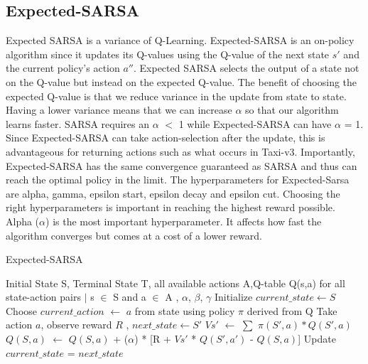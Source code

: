 \documentclass{svproc}
\begin{document}
\subsection{Expected-SARSA}
 Expected SARSA is a variance of Q-Learning. Expected-SARSA is an on-policy algorithm since it updates its Q-values using the Q-value of the next state $s'$ and the current policy's action $a''$. Expected SARSA selects the output of a state not on the Q-value but instead on the expected Q-value. The benefit of choosing the expected Q-value is that we reduce variance in the update from state to state. Having a lower variance means that we can increase $\alpha$ so that our algorithm learns faster. SARSA requires an \newline $\alpha$ $<$ 1 while Expected-SARSA can have $\alpha$ = 1. Since Expected-SARSA can take action-selection after the update, this is advantageous for returning actions such as what occurs in Taxi-v3. Importantly, Expected-SARSA has the same convergence guaranteed \citep{van2009theoretical} as SARSA and thus can reach the optimal policy in the limit.
\newline
The hyperparameters for Expected-Sarsa are alpha, gamma, epsilon start, epsilon decay and epsilon cut. Choosing the right hyperparameters is important in reaching the highest reward possible. Alpha ($\alpha$) is the most important hyperparameter. It affects how fast the algorithm converges but comes at a cost of a lower reward.

\begin{algorithm}[h]
\caption{Expected-SARSA}
\begin{algorithmic}[1]
\REQUIRE Initial State S, Terminal State T, all available actions A,Q-table Q(s,a) for all state-action pairs $\mid$ s $\in$ S and a $\in$ A , $\alpha$, $\beta$, $\gamma$
\STATE Initialize $current\_state \leftarrow  S$
\REPEAT
\STATE Choose $current\_action$ $\leftarrow$ $a$  from state using policy $\pi$ derived from Q
\STATE Take action $a$, observe reward $R$ , $next\_state \leftarrow S'$
\STATE $Vs'$ $\leftarrow$ $\sum$ $\pi(S', a) * Q(S', a)$
\STATE $Q(S,a)$ $\leftarrow$  $Q(S,a)$ +  ($\alpha$) * [R + $Vs'$ * $Q(S',a')$ - $Q(S,a)$]
\STATE Update $current\_state$ = $next\_state$
\end{algorithmic}
\end{algorithm}
\end{document}
